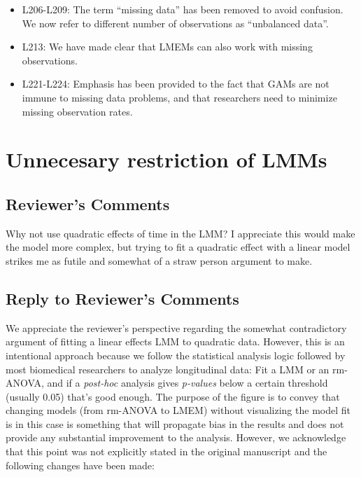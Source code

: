 \documentclass[
]{article}
\begin{document}
\begin{itemize}
\item
  L206-L209: The term ``missing data'' has been removed to avoid confusion. We now refer to different number of observations as ``unbalanced data''.
\item
  L213: We have made clear that LMEMs can also work with missing observations.
\item
  L221-L224: Emphasis has been provided to the fact that GAMs are not immune to missing data problems, and that researchers need to minimize missing observation rates.
\end{itemize}

\hypertarget{unnecesary-restriction-of-lmms}{%
\section{Unnecesary restriction of LMMs}\label{unnecesary-restriction-of-lmms}}

\hypertarget{reviewers-comments-1}{%
\subsection{Reviewer's Comments}\label{reviewers-comments-1}}

Why not use quadratic effects of time in the LMM? I appreciate this would make the model more complex, but trying to fit a quadratic effect with a linear model strikes me as futile and somewhat of a straw person argument to make.

\hypertarget{section-2}{%
\subsection{\texorpdfstring{\textcolor{reviewersblue} {Reply to Reviewer's Comments}}{}}\label{section-2}}

We appreciate the reviewer's perspective regarding the somewhat contradictory argument of fitting a linear effects LMM to quadratic data. However, this is an intentional approach because we follow the statistical analysis logic followed by most biomedical researchers to analyze longitudinal data: Fit a LMM or an rm-ANOVA, and if a \emph{post-hoc} analysis gives \emph{p-values} below a certain threshold (usually 0.05) that's good enough. The purpose of the figure is to convey that changing models (from rm-ANOVA to LMEM) without visualizing the model fit is in this case is something that will propagate bias in the results and does not provide any substantial improvement to the analysis. However, we acknowledge that this point was not explicitly stated in the original manuscript and the following changes have been made:
\end{document}
